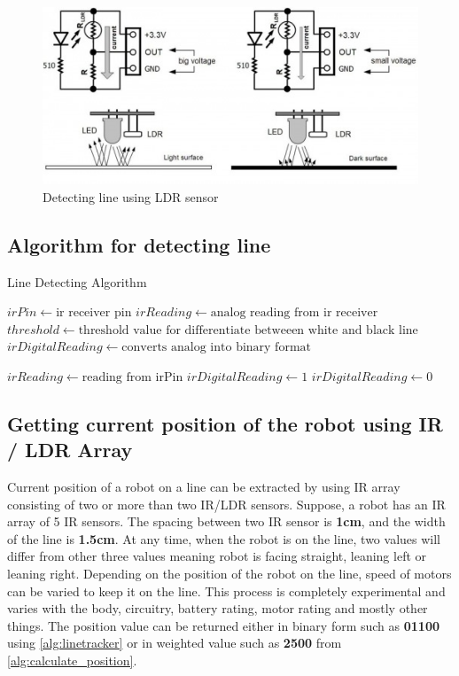 \documentclass[14pt,a4paper]{extarticle}
\begin{document}
		\begin{figure}[!h]
			\includegraphics[width=\textwidth]{ldr_line.jpg}
			\caption{Detecting line using LDR sensor}
			\label{fig:detect_line_ldr}
		\end{figure}
		
		
			\subsection{Algorithm for detecting line}
		\begin{algorithm}
		\caption{Line Detecting Algorithm}\label{alg:linetracker}
		\begin{algorithmic}[1]
		
		\State $irPin \gets \text{ir receiver pin}$
		\State $irReading \gets \text {analog reading from ir receiver} $
		\State $threshold \gets \text {threshold value for differentiate betweeen white and black line} $
		\State $irDigitalReading \gets \text {converts analog into binary format} $
		
		\State $ irReading \gets \text{reading from irPin}$		
		\State $irDigitalReading \gets 1$
		\Else 
		\State $irDigitalReading \gets 0$
		\EndIf
		\EndProcedure
		\end{algorithmic}
		\end{algorithm}
	
	\subsection{Getting current position of the robot using IR / LDR Array}
	Current position of a robot on a line can be extracted by using IR array consisting of two or more than two IR/LDR sensors. Suppose, a robot has an IR array of 5 IR sensors. The spacing between two IR sensor is \textbf{1cm}, and the width of the line is \textbf{1.5cm}. At any time, when the robot is on the line, two values will differ from other three values meaning robot is facing straight, leaning left or leaning right. Depending on the position of the robot on the line, speed of motors can be varied to keep it on the line. This process is completely experimental and varies with the body, circuitry, battery rating, motor rating and mostly other things. The position value can be returned either in binary form such as \textbf{01100} using \ref{alg:linetracker} or in weighted value such as \textbf{2500} from \ref{alg:calculate_position}.
	
\end{document}
